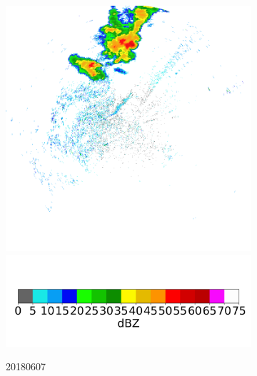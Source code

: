 \begin{figure}[h]
\begin{subfigure}[b]{0.45\textwidth}
		\includegraphics[width=\textwidth]{./thesis_code/plots/midlothian-tx-20180607-233029-ref.png}
		\includegraphics[width=\textwidth]{./thesis_code/plots/dfw_colormap.png}
		\caption{20180607}
		\label{fig:classifying_datadiscovery_ex2}
	\end{subfigure}
	\begin{subfigure}[b]{0.45\textwidth}

\end{subfigure}
\end{figure}
